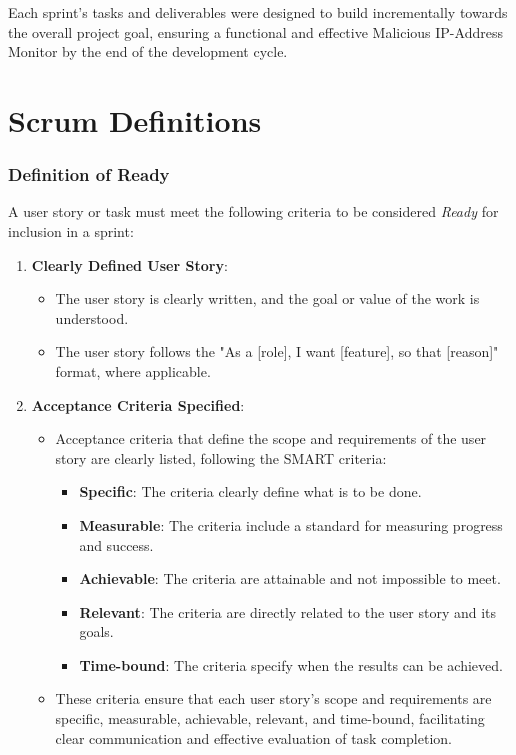 \documentclass[11pt,a4paper]{article}
\begin{document}
    Each sprint's tasks and deliverables were designed to build incrementally towards the overall project goal, ensuring a functional and effective Malicious IP-Address Monitor by the end of the development cycle.

    \section{Scrum Definitions}\label{subsec:scrum-definitions}

    \subsubsection{Definition of Ready}
    A user story or task must meet the following criteria to be considered \textit{Ready} for inclusion in a sprint:
    \begin{enumerate}
        \item \textbf{Clearly Defined User Story}:
        \begin{itemize}
            \item The user story is clearly written, and the goal or value of the work is understood.
            \item The user story follows the "As a [role], I want [feature], so that [reason]" format, where applicable.
        \end{itemize}

        \item \textbf{Acceptance Criteria Specified}:
        \begin{itemize}
            \item Acceptance criteria that define the scope and requirements of the user story are clearly listed, following the SMART criteria:
            \begin{itemize}
                \item \textbf{Specific}: The criteria clearly define what is to be done.
                \item \textbf{Measurable}: The criteria include a standard for measuring progress and success.
                \item \textbf{Achievable}: The criteria are attainable and not impossible to meet.
                \item \textbf{Relevant}: The criteria are directly related to the user story and its goals.
                \item \textbf{Time-bound}: The criteria specify when the results can be achieved.
            \end{itemize}
            \item These criteria ensure that each user story's scope and requirements are specific, measurable, achievable, relevant, and time-bound, facilitating clear communication and effective evaluation of task completion.
        \end{itemize}


\end{enumerate}
\end{document}
